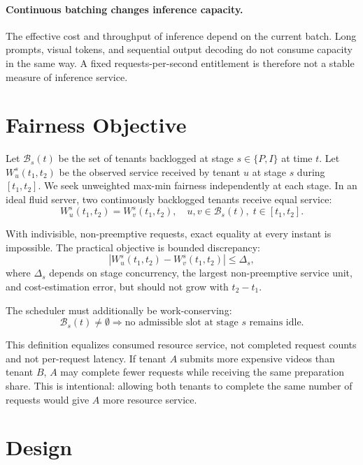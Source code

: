 \documentclass[sigplan,anonymous,review,nonacm]{acmart}
\begin{document}
\paragraph{Continuous batching changes inference capacity.}
The effective cost and throughput of inference depend on the current batch.
Long prompts, visual tokens, and sequential output decoding do not consume
capacity in the same way. A fixed requests-per-second entitlement is therefore
not a stable measure of inference service.

\section{Fairness Objective}

Let $\mathcal{B}_s(t)$ be the set of tenants backlogged at stage
$s\in\{P,I\}$ at time $t$. Let $W^s_u(t_1,t_2)$ be the observed service
received by tenant $u$ at stage $s$ during $[t_1,t_2]$. We seek unweighted
max-min fairness independently at each stage. In an ideal fluid server, two
continuously backlogged tenants receive equal service:
\begin{equation}
W^s_u(t_1,t_2) = W^s_v(t_1,t_2),
\quad u,v\in\mathcal{B}_s(t),\;t\in[t_1,t_2].
\end{equation}

With indivisible, non-preemptive requests, exact equality at every instant is
impossible. The practical objective is bounded discrepancy:
\begin{equation}
\left|W^s_u(t_1,t_2)-W^s_v(t_1,t_2)\right| \leq \Delta_s,
\label{eq:bounded-fairness}
\end{equation}
where $\Delta_s$ depends on stage concurrency, the largest non-preemptive
service unit, and cost-estimation error, but should not grow with
$t_2-t_1$.

The scheduler must additionally be work-conserving:
\begin{equation}
\mathcal{B}_s(t)\neq\emptyset
\Longrightarrow
\text{no admissible slot at stage $s$ remains idle}.
\end{equation}

This definition equalizes consumed resource service, not completed request
counts and not per-request latency. If tenant $A$ submits more expensive videos
than tenant $B$, $A$ may complete fewer requests while receiving the same
preparation share. This is intentional: allowing both tenants to complete the
same number of requests would give $A$ more resource service.

\section{Design}
\label{sec:design}
\end{document}
